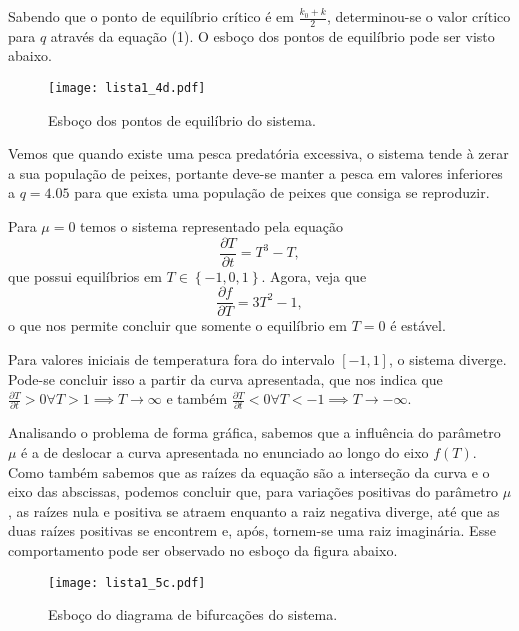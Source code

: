 \documentclass[a4paper]{report}
\begin{document}

Sabendo que o ponto de equilíbrio crítico é em $\frac{k_0+k}{2}$, determinou-se o valor crítico para $q$ através da equação (1). O esboço dos pontos de equilíbrio pode ser visto abaixo.

\begin{figure}[H]
    \centering
    \texttt{[image: lista1\_4d.pdf]}
    \caption{Esboço dos pontos de equilíbrio do sistema.}
    \label{fig:lista1_4d-pdf}
\end{figure}

Vemos que quando existe uma pesca predatória excessiva, o sistema tende à zerar a sua população de peixes, portante deve-se manter a pesca em valores inferiores a $q=4.05$ para que exista uma população de peixes que consiga se reproduzir.



Para $\mu=0$ temos o sistema representado pela equação \[
\frac{\partial T}{\partial t} = T^3 - T
,\] que possui equilíbrios em $T \in \left\{ -1, 0, 1 \right\} $. Agora, veja que \[
\frac{\partial f}{\partial T} = 3T^2 -1
,\] o que nos permite concluir que somente o equilíbrio em $T=0$ é estável.


Para valores iniciais de temperatura fora do intervalo $[-1,1]$, o sistema diverge. Pode-se concluir isso a partir da curva apresentada, que nos indica que $\frac{\partial T}{\partial t} > 0 \forall T>1 \implies T \to \infty$ e também $\frac{\partial T}{\partial t} < 0 \forall T < -1 \implies T \to -\infty$.


Analisando o problema de forma gráfica, sabemos que a influência do parâmetro $\mu$ é a de deslocar a curva apresentada no enunciado ao longo do eixo $f(T)$. Como também sabemos que as raízes da equação são a interseção da curva e o eixo das abscissas, podemos concluir que, para variações positivas do parâmetro $\mu$, as raízes nula e positiva se atraem enquanto a raiz negativa diverge, até que as duas raízes positivas se encontrem e, após, tornem-se uma raiz imaginária. Esse comportamento pode ser observado no esboço da figura abaixo.

\begin{figure}[H]
    \centering
    \texttt{[image: lista1\_5c.pdf]}
    \caption{Esboço do diagrama de bifurcações do sistema.}
    \label{fig:lista1_5c-pdf}
\end{figure}
\end{document}
